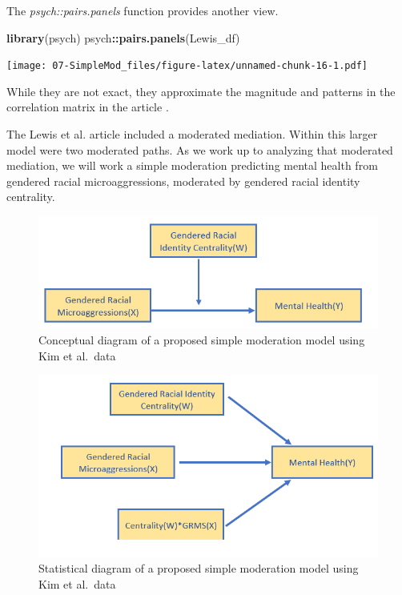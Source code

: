 \documentclass[
  11pt,
]{book}
\newenvironment{Shaded}{\begin{snugshade}}{\end{snugshade}}
\newcommand{\FunctionTok}[1]{\textcolor[rgb]{0.27,0.27,0.27}{\textbf{#1}}}
\newcommand{\NormalTok}[1]{#1}
\newcommand{\SpecialCharTok}[1]{\textcolor[rgb]{0.43,0.43,0.43}{\textbf{#1}}}
\begin{document}
The \emph{psych::pairs.panels} function provides another view.

\begin{Shaded}
\begin{Highlighting}[]
\FunctionTok{library}\NormalTok{(psych)}
\NormalTok{psych}\SpecialCharTok{::}\FunctionTok{pairs.panels}\NormalTok{(Lewis\_df)}
\end{Highlighting}
\end{Shaded}

\texttt{[image: 07-SimpleMod\_files/figure-latex/unnamed-chunk-16-1.pdf]}

While they are not exact, they approximate the magnitude and patterns in the correlation matrix in the article \citep{lewis_applying_2017}.

The Lewis et al. \citeyearpar{lewis_applying_2017} article included a moderated mediation. Within this larger model were two moderated paths. As we work up to analyzing that moderated mediation, we will work a simple moderation predicting mental health from gendered racial microaggressions, moderated by gendered racial identity centrality.

\begin{figure}
\centering
\includegraphics{images/SimpleMod/Lewis_SimpMod_Conceptual.png}
\caption{Conceptual diagram of a proposed simple moderation model using Kim et al.~data}
\end{figure}

\begin{figure}
\centering
\includegraphics{images/SimpleMod/Lewis_SimpMod_Statistical.png}
\caption{Statistical diagram of a proposed simple moderation model using Kim et al.~data}
\end{figure}
\end{document}
